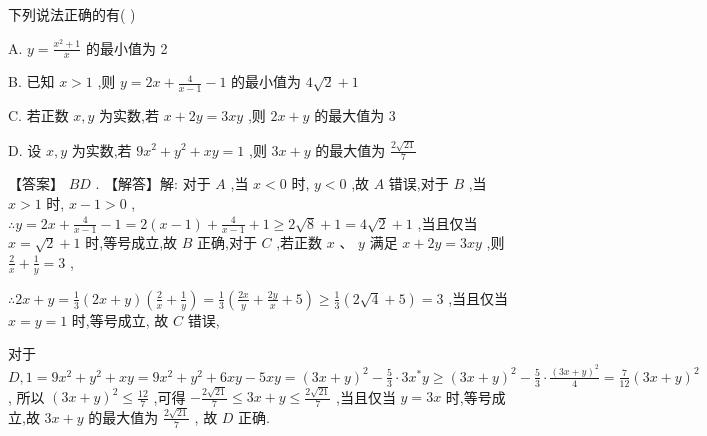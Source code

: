 \documentclass[11pt,a4paper]{article}
\begin{document}
\begin{problem} 
下列说法正确的有(   ) 

A. \(\displaystyle y = \frac{{x}^{2} + 1}{x}\) 的最小值为 2 

B. 已知 \(\displaystyle x > 1\) ,则 \(\displaystyle y = {2x} + \frac{4}{x - 1} - 1\) 的最小值为 \(\displaystyle 4\sqrt{2} + 1\) 

C. 若正数 \(\displaystyle x,y\) 为实数,若 \(\displaystyle x + {2y} = {3xy}\) ,则 \(\displaystyle {2x} + y\) 的最大值为 3 

D. 设 \(\displaystyle x,y\) 为实数,若 \(\displaystyle 9{x}^{2} + {y}^{2} + {xy} = 1\) ,则 \(\displaystyle {3x} + y\) 的最大值为 \(\displaystyle \frac{2\sqrt{21}}{7}\) 
\begin{jiexi}
【答案】 \(\displaystyle {BD}\) . 【解答】解: 对于 \(\displaystyle A\) ,当 \(\displaystyle x < 0\) 时, \(\displaystyle y < 0\) ,故 \(\displaystyle A\) 错误,对于 \(\displaystyle B\) ,当 \(\displaystyle x > 1\) 时, \(\displaystyle x - 1 > 0\) , \(\displaystyle \therefore y = {2x} + \frac{4}{x - 1} - 1 = 2\left( {x - 1}\right)  + \frac{4}{x - 1} + 1 \geq  2\sqrt{8} + 1 = 4\sqrt{2} + 1\) ,当且仅当 \(\displaystyle x = \sqrt{2} + 1\) 时,等号成立,故 \(\displaystyle B\) 正确,对于 \(\displaystyle C\) ,若正数 \(\displaystyle x\text{ 、 }y\) 满足 \(\displaystyle x + {2y} = {3xy}\) ,则 \(\displaystyle \frac{2}{x} + \frac{1}{y} = 3\) ,

\(\displaystyle \therefore {2x} + y = \frac{1}{3}\left( {{2x} + y}\right) \left( {\frac{2}{x} + \frac{1}{y}}\right)  = \frac{1}{3}\left( {\frac{2x}{y} + \frac{2y}{x} + 5}\right)  \geq  \frac{1}{3}\left( {2\sqrt{4} + 5}\right)  = 3\) ,当且仅当 \(\displaystyle x = y = 1\) 时,等号成立, 故 \(\displaystyle C\) 错误,

对于 \(\displaystyle D,1 = 9{x}^{2} + {y}^{2} + {xy} = 9{x}^{2} + {y}^{2} + {6xy} - {5xy} = {\left( 3x + y\right) }^{2} - \frac{5}{3} \cdot  3{x}^{ * }y \geq  {\left( 3x + y\right) }^{2} - \frac{5}{3} \cdot  \frac{{\left( 3x + y\right) }^{2}}{4} = \frac{7}{12}{\left( 3x + y\right) }^{2}\) , 所以 \(\displaystyle {\left( 3x + y\right) }^{2} \leq  \frac{12}{7}\) ,可得 \(\displaystyle - \frac{2\sqrt{21}}{7} \leq  {3x} + y \leq  \frac{2\sqrt{21}}{7}\) ,当且仅当 \(\displaystyle y = {3x}\) 时,等号成立,故 \(\displaystyle {3x} + y\) 的最大值为 \(\displaystyle \frac{2\sqrt{21}}{7}\) , 故 \(\displaystyle D\) 正确.



\end{jiexi}
\end{problem}
\end{document}
